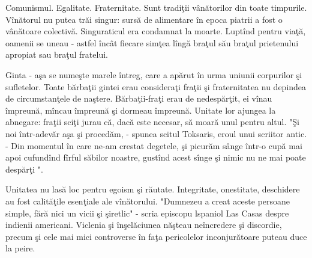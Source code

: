 Comunismul. Egalitate. Fraternitate. Sunt tradiţii vânătorilor  din toate timpurile. Vînătorul nu putea trăi singur: sursă de alimentare în epoca piatrii a fost o vânătoare colectivă. Singuraticul era  condamnat la moarte. Luptînd pentru viaţă, oamenii se uneau - astfel încât fiecare simţea lîngă braţul său braţul prietenului apropiat sau braţul fratelui.

Ginta - aşa se numeşte marele întreg, care a apărut în urma uniunii corpurilor şi sufletelor. Toate bărbaţii gintei erau consideraţi fraţii şi fraternitatea nu depindea de circumstanţele de naştere. Bărbaţii-fraţi erau de nedespărţit, ei vînau împreună, mîncau împreună şi  dormeau împreună. Unitate lor ajungea la abnegare: fraţii sciţi jurau că, dacă este necesar, să moară unul pentru altul. "Şi noi într-adevăr aşa şi procedăm, - spunea scitul Toksaris, eroul unui scriitor antic. - Din momentul în care ne-am crestat degetele, şi picurăm sânge într-o cupă mai apoi cufundînd fîrful săbilor noastre, gustînd acest sînge şi nimic nu ne mai poate despărţi ".

Unitatea nu lasă loc pentru egoism şi răutate. Integritate, onestitate, deschidere au fost calităţile esenţiale ale vînătorului. "Dumnezeu a creat aceste persoane simple, fără nici un vicii şi şiretlic" - scria episcopu lspaniol  Las Casas despre indienii americani. Viclenia şi înşelăciunea năşteau neîncredere şi discordie, precum şi cele mai mici controverse în faţa pericolelor inconjurătoare  puteau duce la peire.

